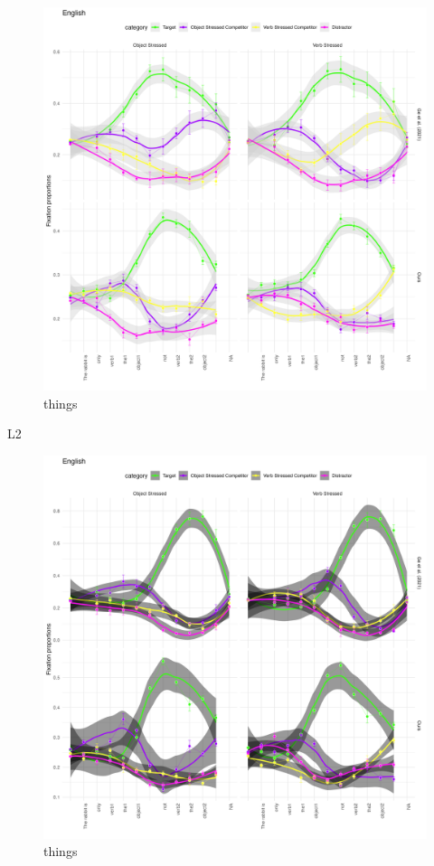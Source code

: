 \begin{figure}[H]  %
    \centering
    \includegraphics[width=\textwidth,height=\textheight,keepaspectratio]{viz/english_fix2.png}
    \caption{things}
    \label{fig:english_fix2}
\end{figure}

L2

\begin{figure}[H]  %
    \centering
    \includegraphics[width=\textwidth,height=\textheight,keepaspectratio]{viz/dutch_fix2.png}
    \caption{things}
    \label{fig:english_fix2}
\end{figure}

